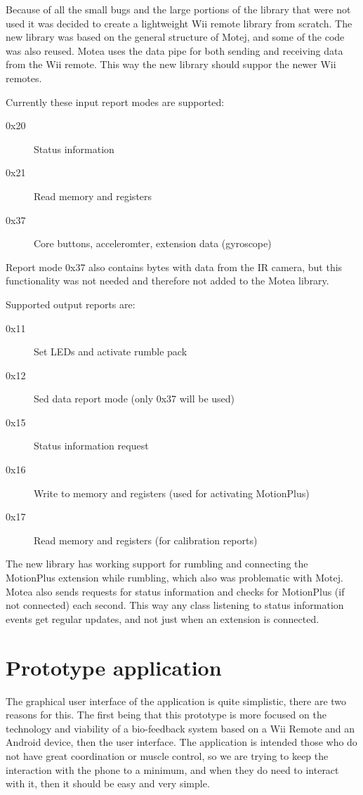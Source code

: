 Because of all the small bugs and the large portions of the library that were not used it was decided to create a lightweight Wii remote library from scratch. The new library was based on the general structure of Motej, and some of the code was also reused. Motea uses the data pipe for both sending and receiving data from the Wii remote. This way the new library should suppor the newer Wii remotes. 

Currently these input report modes are supported:
\begin{description}
	\item[0x20] Status information
	\item[0x21] Read memory and registers
	\item[0x37] Core buttons, acceleromter, extension data (gyroscope)
\end{description}

Report mode 0x37 also contains bytes with data from the IR camera, but this functionality was not needed and therefore not added to the Motea library.

Supported output reports are:
\begin{description}
	\item[0x11] Set LEDs and activate rumble pack
	\item[0x12] Sed data report mode (only 0x37 will be used)
	\item[0x15] Status information request
	\item[0x16] Write to memory and registers (used for activating MotionPlus)
	\item[0x17] Read memory and registers (for calibration reports)
\end{description}

The new library has working support for rumbling and connecting the MotionPlus extension while rumbling, which also was problematic with Motej. Motea also sends requests for status information and checks for MotionPlus (if not connected) each second. This way any class listening to status information events get regular updates, and not just when an extension is connected.

\section{Prototype application}
The graphical user interface of the application is quite simplistic, there are two reasons for this. The first being that this prototype is more focused on the technology and viability of a bio-feedback system based on a Wii Remote and an Android device, then the user interface. The application is intended those who do not have great coordination or muscle control, so we are trying to keep the interaction with the phone to a minimum, and when they do need to interact with it, then it should be easy and very simple.

